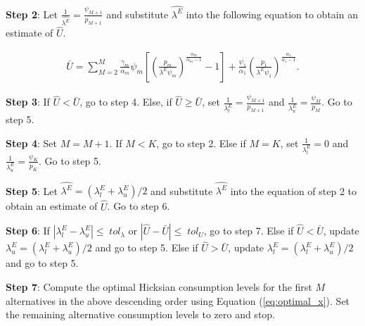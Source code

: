 \textbf{Step 2}: Let
\(\frac{1}{\hat{\lambda^E}} = \frac{\psi_{M+1}}{p_{M+1}}\) and
substitute \(\hat{\lambda^E}\) into the following equation to obtain an
estimate of \(\hat{U}\).

\begin{align}
\bar{U}=\sum_{M=2}^{M} \frac{\gamma_m}{\alpha_m}\psi_m \left[ \left( \frac{p_m}{\lambda^E \psi_m} \right)^\frac{\alpha_m}{\alpha_m-1} - 1 \right] + \frac{\psi_1}{\alpha_1}\left(\frac{p_1}{\lambda^E \psi_1} \right)^\frac{\alpha_1}{\alpha_1-1}.
\end{align}

\textbf{Step 3}: If \(\hat{U} < \bar{U}\), go to step 4. Else, if
\(\hat{U} \geq \bar{U}\), set
\(\frac{1}{\lambda_l^E}= \frac{\psi_{M+1}}{p_{M+1}}\) and
\(\frac{1}{\lambda_u^E}= \frac{\psi_{M}}{p_{M}}\). Go to step 5.

\textbf{Step 4}: Set \(M=M+1\). If \(M<K\), go to step 2. Else if
\(M=K\), set \(\frac{1}{\lambda_l^E}= 0\) and
\(\frac{1}{\lambda_u^E}= \frac{\psi_{K}}{p_{K}}\). Go to step 5.

\textbf{Step 5}: Let \(\hat{\lambda^E}= (\lambda_l^E+\lambda_u^E)/2\)
and substitute \(\hat{\lambda^E}\) into the equation of step 2 to obtain
an estimate of \(\hat{U}\). Go to step 6.

\textbf{Step 6}: If \(|\lambda_l^E-\lambda_u^E| \leq \; tol_{\lambda}\)
or \(|\hat{U}-\bar{U}| \leq \; tol_{U}\), go to step 7. Else if
\(\hat{U}<\bar{U}\), update \(\lambda^E_u= (\lambda_l^E+\lambda_u^E)/2\)
and go to step 5. Else if \(\hat{U}>\bar{U}\), update
\(\lambda^E_l= (\lambda_l^E+\lambda_u^E)/2\) and go to step 5.

\textbf{Step 7}: Compute the optimal Hicksian consumption levels for the
first \(M\) alternatives in the above descending order using Equation
(\ref{eq:optimal_x}). Set the remaining alternative consumption levels
to zero and stop.




\address{%
Patrick Lloyd-Smith\\
University of Saskatchewan\\
Department of Agricultural and Resource Economics Room 3D34, Agriculture
Building 51 Campus Drive Saskatoon, SK S7N 5A8 Canada\\
}

